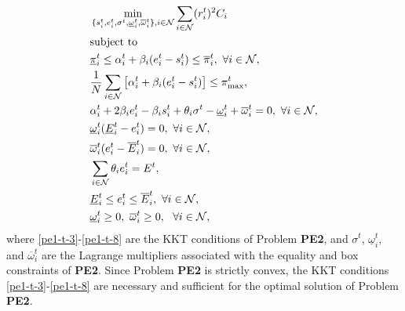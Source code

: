 \documentclass[journal]{IEEEtran}
\begin{document}
	\begin{align}
		& \min_{ \{ s_i^t,e_i^t,\sigma^t,\underline{\omega}_i^t,\overline{\omega}_i^t \}, i \in \mathcal{N} }   
		\begin{aligned}[t]
			\sum_{i \in \mathcal{N}} (r_i^t)^{2} C_i    
		\end{aligned} \notag \\
		& \text{subject to} \notag \\
		& \underline{\pi}_i^t \leq \alpha_{i}^{t} + \beta_{i} (e_{i}^{t}-s_i^t) \leq \overline{\pi}_i^t,~\forall i \in \mathcal{N}, \label{pe1-t-1} \\
		& \frac{1}{N} \sum_{i \in \mathcal{N}} \left[ \alpha_{i}^{t} + \beta_{i} (e_{i}^{t}-s_i^t) \right] \leq \pi_{\max}^{t}, \label{pe1-t-2}\\
		& \alpha_{i}^{t}+2 \beta_{i} e_{i}^{t} - \beta_{i} s_{i}^{t} + \theta_i \sigma^{t} - \underline{\omega}_{i}^{t} + \overline{\omega}_{i}^{t} =0,~\forall i\in\mathcal{N}, \label{pe1-t-3} \\
		& \underline{\omega}_{i}^{t} (\underline{E}_{i}^{t} - e_{i}^{t})=0,~\forall i\in\mathcal{N}, \label{pe1-t-4} \\
		& \overline{\omega}_{i}^{t} (e_{i}^{t} - \overline{E}_{i}^{t}) =0,~\forall i\in\mathcal{N}, \label{pe1-t-5} \\
		& \sum_{i \in \mathcal{N}} \theta_i e_{i}^{t} = E^{t}, \label{pe1-t-6} \\
		& \underline{E}_{i}^{t} \leq e_{i}^{t} \leq \overline{E}_{i}^{t},~\forall i\in\mathcal{N}, \label{pe1-t-7} \\
		& \underline{\omega}_{i}^{t} \geq 0,~\overline{\omega}_{i}^{t} \geq 0,~~\forall i\in\mathcal{N}, \label{pe1-t-8} 
	\end{align}
	where \eqref{pe1-t-3}-\eqref{pe1-t-8} are the KKT conditions of Problem \textbf{PE2}, and $\sigma^t$, $\underline{\omega}_i^t$, and $\overline{\omega}_i^t$ are the Lagrange multipliers associated with the equality and box constraints of \textbf{PE2}. Since Problem \textbf{PE2} is strictly convex, the KKT conditions \eqref{pe1-t-3}-\eqref{pe1-t-8} are necessary and sufficient for the optimal solution of Problem \textbf{PE2}.
	
\end{document}
